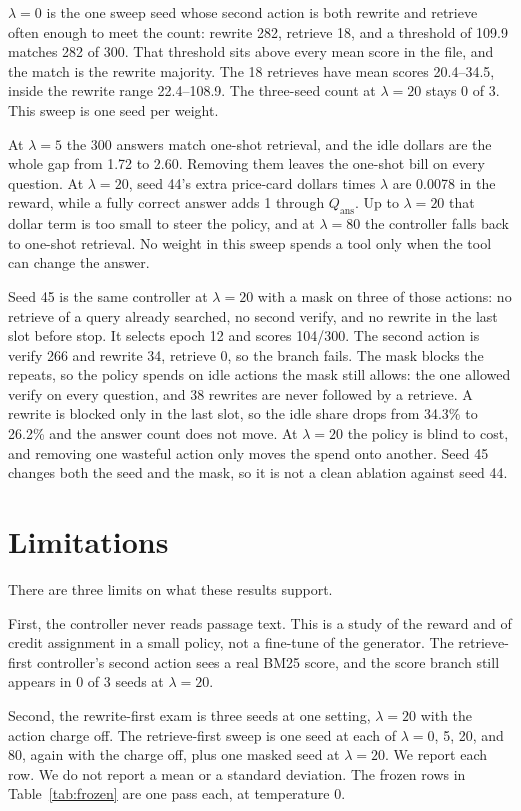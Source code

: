 \documentclass[letterpaper]{article} %
\begin{document}
\(\lambda{=}0\) is the one sweep seed whose second action is both rewrite and retrieve often enough to meet the count: rewrite 282, retrieve 18, and a threshold of 109.9 matches 282 of 300. That threshold sits above every mean score in the file, and the match is the rewrite majority. The 18 retrieves have mean scores 20.4--34.5, inside the rewrite range 22.4--108.9. The three-seed count at \(\lambda{=}20\) stays 0 of 3. This sweep is one seed per weight.

At \(\lambda{=}5\) the 300 answers match one-shot retrieval, and the idle dollars are the whole gap from 1.72 to 2.60. Removing them leaves the one-shot bill on every question. At \(\lambda{=}20\), seed 44's extra price-card dollars times \(\lambda\) are 0.0078 in the reward, while a fully correct answer adds 1 through \(Q_{\mathrm{ans}}\). Up to \(\lambda{=}20\) that dollar term is too small to steer the policy, and at \(\lambda{=}80\) the controller falls back to one-shot retrieval. No weight in this sweep spends a tool only when the tool can change the answer.

Seed 45 is the same controller at \(\lambda{=}20\) with a mask on three of those actions: no retrieve of a query already searched, no second verify, and no rewrite in the last slot before stop. It selects epoch 12 and scores 104/300. The second action is verify 266 and rewrite 34, retrieve 0, so the branch fails. The mask blocks the repeats, so the policy spends on idle actions the mask still allows: the one allowed verify on every question, and 38 rewrites are never followed by a retrieve. A rewrite is blocked only in the last slot, so the idle share drops from 34.3\% to 26.2\% and the answer count does not move. At \(\lambda{=}20\) the policy is blind to cost, and removing one wasteful action only moves the spend onto another. Seed 45 changes both the seed and the mask, so it is not a clean ablation against seed 44.

\section{Limitations}
There are three limits on what these results support.

First, the controller never reads passage text. This is a study of the reward and of credit assignment in a small policy, not a fine-tune of the generator. The retrieve-first controller's second action sees a real BM25 score, and the score branch still appears in 0 of 3 seeds at \(\lambda{=}20\).

Second, the rewrite-first exam is three seeds at one setting, \(\lambda{=}20\) with the action charge off. The retrieve-first sweep is one seed at each of \(\lambda{=}0\), 5, 20, and 80, again with the charge off, plus one masked seed at \(\lambda{=}20\). We report each row. We do not report a mean or a standard deviation. The frozen rows in Table~\ref{tab:frozen} are one pass each, at temperature 0.
\end{document}
